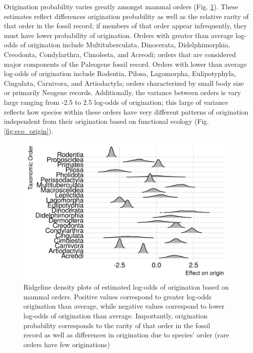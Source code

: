 \documentclass[12pt,letterpaper]{article}
\begin{document}
Origination probability varies greatly amongst mammal orders (Fig. \ref{fig:order_origin}). These estimates reflect differences origination probability as well as the relative rarity of that order in the fossil record; if members of that order appear infrequently, they must have lower probability of origination. Orders with greater than average log-odds of origination include Multituberculata, Dinocerata, Didelphimorphia, Creodonta, Condylarthra, Cimolesta, and Acreodi; orders that are considered major components of the Paleogene fossil record. Orders with lower than average log-odds of origination include Rodentia, Pilosa, Lagomorpha, Eulipotyphyla, Cingulata, Carnivora, and Artiodactyla; orders characterized by small body size or primarily Neogene records. Additionally, the variance between orders is vary large ranging from -2.5 to 2.5 log-odds of origination; this large of variance reflects how species within these orders have very different patterns of origination independent from their origination based on functional ecology (Fig. \ref{fig:eco_origin}).
\begin{figure}[ht]
  \centering
  \includegraphics[width=\textwidth,height=0.4\textheight,keepaspectratio=true]{figure/order_origin_bd}
  \caption{Ridgeline density plots of estimated log-odds of origination based on mammal orders. Positive values correspond to greater log-odds origination than average, while negative values correspond to lower log-odds of origination than average. Importantly, origination probability corresponds to the rarity of that order in the fossil record as well as differences in origination due to species' order (rare orders have few originations)}
  \label{fig:order_origin}
\end{figure}
\end{document}
